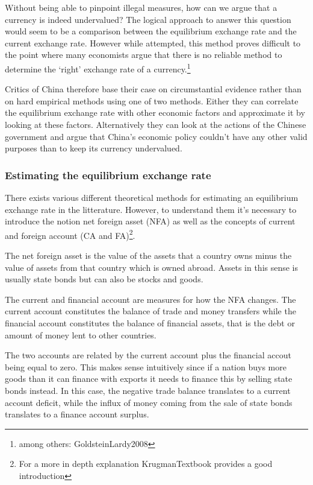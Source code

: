 \documentclass[11pt]{article}
\begin{document}
Without being able to pinpoint illegal measures, how can we argue that a 
currency is indeed undervalued? The logical approach to answer this 
question would seem to be a comparison between the equilibrium exchange 
rate and the current exchange rate. However while attempted, this method 
proves difficult to the point where many economists argue that there is 
no reliable method to determine the `right' exchange rate of a 
currency.\footnote{among others: \cite{pp.  4}{GoldsteinLardy2008}}

Critics of China therefore base their case on circumstantial evidence 
rather than on hard empirical methods using one of two methods. Either 
they can correlate the equilibrium exchange rate with other economic 
factors and approximate it by looking at these factors. Alternatively 
they can look at the actions of the Chinese government and argue that 
China's economic policy couldn't have any other valid purposes than to 
keep its currency undervalued.

\subsubsection{Estimating the equilibrium exchange rate}

There exists various different theoretical methods for estimating an 
equilibrium exchange rate in the litterature. However, to understand 
them it's necessary to introduce the notion net foreign asset (NFA) as 
well as the concepts of current and foreign account (CA and 
FA)\footnote{For a more in depth explanation \cite{ch.  
18}{KrugmanTextbook} provides a good introduction}.

The net foreign asset is the value of the assets that a country owns 
minus the value of assets from that country which is owned abroad.  
Assets in this sense is usually state bonds but can also be stocks and 
goods.  

The current and financial account are measures for how the NFA changes.  
The current account constitutes the balance of trade and money transfers 
while the financial account constitutes the balance of financial assets, 
that is the debt or amount of money lent to other countries. 

The two accounts are related by the current account plus the financial 
accout being equal to zero. This makes sense intuitively since if a 
nation buys more goods than it can finance with exports it needs to 
finance this by selling state bonds instead. In this case, the negative 
trade balance translates to a current account deficit, while the influx 
of money coming from the sale of state bonds translates to a finance 
account surplus.
\end{document}
